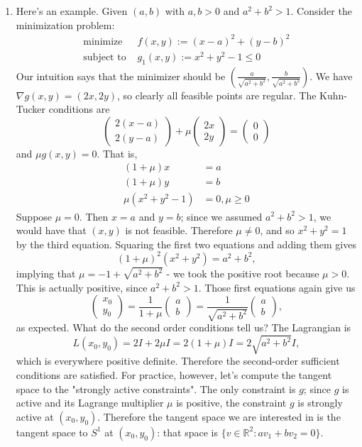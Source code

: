 \documentclass[11pt]{article}
\newcommand{\R}{\mathbb{R}}
\begin{document}
\begin{enumerate}
\item
Here's an example. Given $(a,b)$ with $a,b > 0$ and $a^2+b^2 > 1$. Consider the minimization problem:
\begin{align*}
\text{minimize } &f(x,y) := (x-a)^2 + (y-b)^2 \\
\text{subject to } &g_1(x,y) := x^2+y^2-1 \leq 0
\end{align*}
Our intuition says that the minimizer should be $\left( \frac{a}{\sqrt{a^2+b^2}}, \frac{b}{\sqrt{a^2+b^2}} \right)$. We have $\nabla g(x,y) = (2x, 2y)$, so clearly all feasible points are regular. The Kuhn-Tucker conditions are
\[
\begin{pmatrix}
2(x-a) \\ 2(y-a)
\end{pmatrix} + \mu \begin{pmatrix}
2x \\ 2y
\end{pmatrix} = \begin{pmatrix}
0 \\ 0
\end{pmatrix}
\]
and $\mu g(x,y) = 0$. That is,
\begin{align*}
(1+\mu)x &= a \\
(1+\mu)y &= b \\
\mu (x^2+y^2 - 1) &= 0, \mu \geq 0
\end{align*}
Suppose $\mu = 0$. Then $x = a$ and $y = b$; since we assumed $a^2+b^2 > 1$, we would have that $(x,y)$ is not feasible. Therefore $\mu \neq 0$, and so $x^2+y^2 = 1$ by the third equation. Squaring the first two equations and adding them gives
\[
(1+\mu)^2 (x^2+y^2) = a^2+b^2,
\]
implying that $\mu = -1 + \sqrt{a^2+b^2}$ - we took the positive root because $\mu > 0$. This is actually positive, since $a^2+b^2 > 1$. Those first equations again give us
\[
\begin{pmatrix}
x_0 \\ y_0
\end{pmatrix} = \frac{1}{1+\mu} \begin{pmatrix}
a \\ b
\end{pmatrix} = \frac{1}{\sqrt{a^2+b^2}} \begin{pmatrix}
a \\ b
\end{pmatrix},
\]
as expected. What do the second order conditions tell us? The Lagrangian is
\[
L(x_0, y_0) = 2I + 2\mu I = 2(1+\mu)I = 2\sqrt{a^2+b^2} I,
\]
which is everywhere positive definite. Therefore the second-order sufficient conditions are satisfied. For practice, however, let's compute the tangent space to the "strongly active constraints". The only constraint is $g$; since $g$ is active and its Lagrange multiplier $\mu$ is positive, the constraint $g$ is strongly active at $(x_0, y_0)$. Therefore the tangent space we are interested in is the tangent space to $S^1$ at $(x_0, y_0)$: that space is $\{v \in \R^2 : av_1 + bv_2 = 0\}$.


\end{enumerate}
\end{document}
